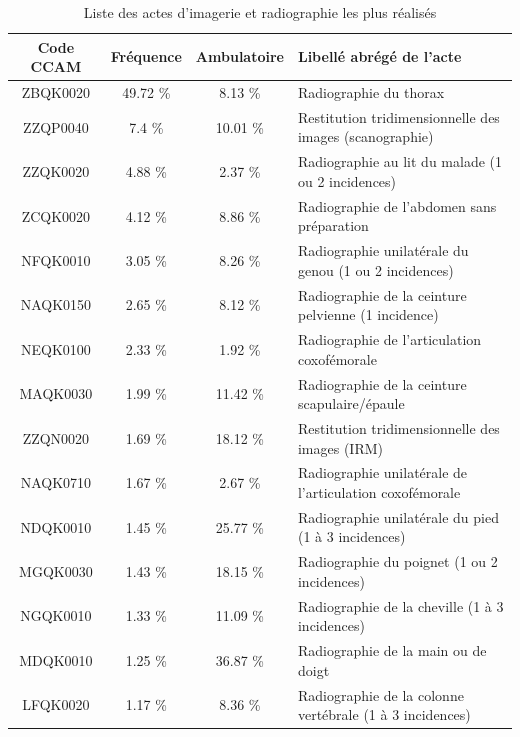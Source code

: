 \begin{table}[!ht]
\centering
\caption{Liste des actes d'imagerie et radiographie les plus réalisés}
\label{liste3}
\begin{tabular}{c|ccl}
  \hline
Code CCAM & Fréquence & Ambulatoire & Libellé abrégé de l'acte \\ 
  \hline
ZBQK0020 & 49.72 \% & 8.13 \% & Radiographie du thorax \\ 
  ZZQP0040 & 7.4 \% & 10.01 \% & Restitution tridimensionnelle des images (scanographie) \\ 
  ZZQK0020 & 4.88 \% & 2.37 \% & Radiographie au lit du malade (1 ou 2 incidences) \\ 
  ZCQK0020 & 4.12 \% & 8.86 \% & Radiographie de l'abdomen sans préparation \\ 
  NFQK0010 & 3.05 \% & 8.26 \% & Radiographie unilatérale du genou (1 ou 2 incidences) \\ 
  NAQK0150 & 2.65 \% & 8.12 \% & Radiographie de la ceinture pelvienne (1 incidence) \\ 
  NEQK0100 & 2.33 \% & 1.92 \% & Radiographie de l'articulation coxofémorale \\ 
  MAQK0030 & 1.99 \% & 11.42 \% & Radiographie de la ceinture scapulaire/épaule \\ 
  ZZQN0020 & 1.69 \% & 18.12 \% & Restitution tridimensionnelle des images (IRM) \\ 
  NAQK0710 & 1.67 \% & 2.67 \% & Radiographie unilatérale de l'articulation coxofémorale \\ 
  NDQK0010 & 1.45 \% & 25.77 \% & Radiographie unilatérale du pied (1 à 3 incidences) \\ 
  MGQK0030 & 1.43 \% & 18.15 \% & Radiographie du poignet (1 ou 2 incidences) \\ 
  NGQK0010 & 1.33 \% & 11.09 \% & Radiographie de la cheville (1 à 3 incidences) \\ 
  MDQK0010 & 1.25 \% & 36.87 \% & Radiographie de la main ou de doigt \\ 
  LFQK0020 & 1.17 \% & 8.36 \% & Radiographie de la colonne vertébrale (1 à 3 incidences) \\ 
   \hline
\end{tabular}
\end{table}


